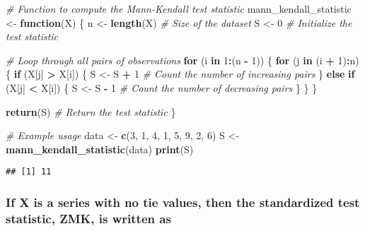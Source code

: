 \documentclass[
]{article}
\newenvironment{Shaded}{\begin{snugshade}}{\end{snugshade}}
\newcommand{\CommentTok}[1]{\textcolor[rgb]{0.56,0.35,0.01}{\textit{#1}}}
\newcommand{\ControlFlowTok}[1]{\textcolor[rgb]{0.13,0.29,0.53}{\textbf{#1}}}
\newcommand{\DecValTok}[1]{\textcolor[rgb]{0.00,0.00,0.81}{#1}}
\newcommand{\FunctionTok}[1]{\textcolor[rgb]{0.13,0.29,0.53}{\textbf{#1}}}
\newcommand{\NormalTok}[1]{#1}
\newcommand{\OtherTok}[1]{\textcolor[rgb]{0.56,0.35,0.01}{#1}}
\newcommand{\SpecialCharTok}[1]{\textcolor[rgb]{0.81,0.36,0.00}{\textbf{#1}}}
\begin{document}
\begin{Shaded}
\begin{Highlighting}[]
\CommentTok{\# Function to compute the Mann{-}Kendall test statistic}
\NormalTok{mann\_kendall\_statistic }\OtherTok{\textless{}{-}} \ControlFlowTok{function}\NormalTok{(X) \{}
\NormalTok{  n }\OtherTok{\textless{}{-}} \FunctionTok{length}\NormalTok{(X)  }\CommentTok{\# Size of the dataset}
\NormalTok{  S }\OtherTok{\textless{}{-}} \DecValTok{0}          \CommentTok{\# Initialize the test statistic}
  
  \CommentTok{\# Loop through all pairs of observations}
  \ControlFlowTok{for}\NormalTok{ (i }\ControlFlowTok{in} \DecValTok{1}\SpecialCharTok{:}\NormalTok{(n }\SpecialCharTok{{-}} \DecValTok{1}\NormalTok{)) \{}
    \ControlFlowTok{for}\NormalTok{ (j }\ControlFlowTok{in}\NormalTok{ (i }\SpecialCharTok{+} \DecValTok{1}\NormalTok{)}\SpecialCharTok{:}\NormalTok{n) \{}
      \ControlFlowTok{if}\NormalTok{ (X[j] }\SpecialCharTok{\textgreater{}}\NormalTok{ X[i]) \{}
\NormalTok{        S }\OtherTok{\textless{}{-}}\NormalTok{ S }\SpecialCharTok{+} \DecValTok{1}  \CommentTok{\# Count the number of increasing pairs}
\NormalTok{      \} }\ControlFlowTok{else} \ControlFlowTok{if}\NormalTok{ (X[j] }\SpecialCharTok{\textless{}}\NormalTok{ X[i]) \{}
\NormalTok{        S }\OtherTok{\textless{}{-}}\NormalTok{ S }\SpecialCharTok{{-}} \DecValTok{1}  \CommentTok{\# Count the number of decreasing pairs}
\NormalTok{      \}}
\NormalTok{    \}}
\NormalTok{  \}}
  
  \FunctionTok{return}\NormalTok{(S)  }\CommentTok{\# Return the test statistic}
\NormalTok{\}}

\CommentTok{\# Example usage}
\NormalTok{data }\OtherTok{\textless{}{-}} \FunctionTok{c}\NormalTok{(}\DecValTok{3}\NormalTok{, }\DecValTok{1}\NormalTok{, }\DecValTok{4}\NormalTok{, }\DecValTok{1}\NormalTok{, }\DecValTok{5}\NormalTok{, }\DecValTok{9}\NormalTok{, }\DecValTok{2}\NormalTok{, }\DecValTok{6}\NormalTok{)}
\NormalTok{S }\OtherTok{\textless{}{-}} \FunctionTok{mann\_kendall\_statistic}\NormalTok{(data)}
\FunctionTok{print}\NormalTok{(S)}
\end{Highlighting}
\end{Shaded}

\begin{verbatim}
## [1] 11
\end{verbatim}

\subsubsection{If X is a series with no tie values, then the
standardized test statistic, ZMK, is written
as}\label{if-x-is-a-series-with-no-tie-values-then-the-standardized-test-statistic-zmk-is-written-as}
\end{document}
